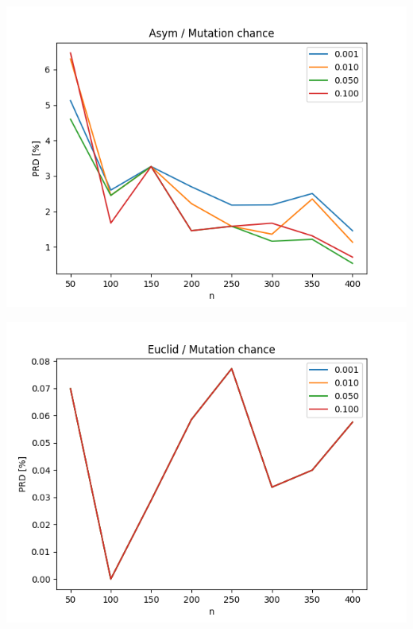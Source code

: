 \documentclass{article}
\begin{document}
\begin{center}
\includegraphics[width=\textwidth, 
                   height = 0.4\textheight, 
                   keepaspectratio]
                  {plots/asym_8_mut_chance} 
\end{center}

\begin{center}
\includegraphics[width=\textwidth, 
                   height = 0.4\textheight, 
                   keepaspectratio]
                  {plots/euclid_8_mut_chance} 
\end{center}
\end{document}
